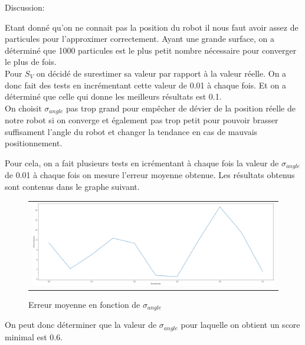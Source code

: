 \documentclass[11pt]{article}		%
\begin{document}
\noindent Discussion:

\noindent Etant donné qu'on ne connait pas la position du robot il nous faut avoir assez de particules pour l'approximer correctement. Ayant une grande surface, on a déterminé que 1000 particules est le plus petit nombre nécessaire pour converger le plus de fois. \\

\noindent Pour $S_V$ on décidé de surestimer sa valeur par rapport à la valeur réelle. On a donc fait des tests en incrémentant cette valeur de 0.01 à chaque fois. Et on a déterminé que celle qui donne les meilleurs résultats est 0.1. \\

\noindent On choisit $\sigma_{angle}$  pas trop grand pour empêcher de dévier de la position réelle de notre robot si on converge et également pas trop petit pour pouvoir brasser suffisament l'angle du robot et changer la tendance en cas de mauvais positionnement. 

\noindent Pour cela, on a fait plusieurs tests en icrémentant à chaque fois la valeur de $\sigma_{angle}$ de 0.01 à chaque fois on mesure l'erreur moyenne obtenue. Les résultats obtenus sont contenus dans le graphe suivant. \\ 

\vspace{0.3in}
\label{LFP}
\begin{figure}[ht]
 \begin{center}
  \begin{tabular}{c}
    \includegraphics[width=1.0\textwidth]{lfp_scompas_err.png} 
  \end{tabular}
 \end{center}
 \vspace{-0.3in}
 \caption{Erreur moyenne en fonction de $\sigma_{angle}$}
 \label{LFP}
\end{figure}

\noindent On peut donc déterminer que la valeur de $\sigma_{angle}$ pour laquelle on obtient un score minimal est 0.6. \\
\end{document}
